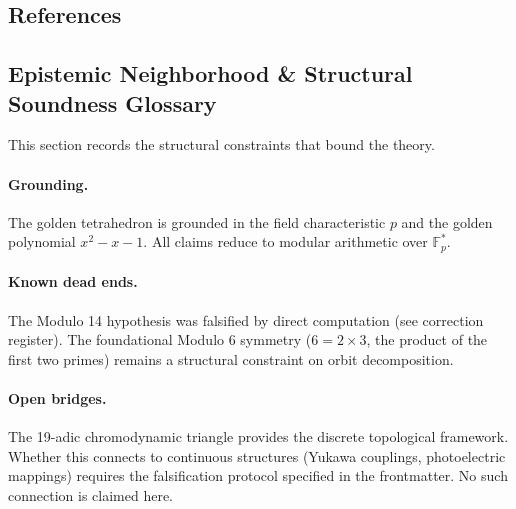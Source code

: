 \documentclass[12pt,oneside]{article}
\theoremstyle{principia}
\theoremstyle{definition}
\theoremstyle{remark}
\begin{document}
\subsection*{References}


\subsection*{Epistemic Neighborhood \& Structural Soundness Glossary}

This section records the structural constraints that bound the theory.

\paragraph{Grounding.} The golden tetrahedron is grounded in the field characteristic $p$ and the golden polynomial $x^2 - x - 1$. All claims reduce to modular arithmetic over $\mathbb{F}_p^*$.

\paragraph{Known dead ends.} The Modulo 14 hypothesis was falsified by direct computation (see correction register). The foundational Modulo 6 symmetry ($6 = 2 \times 3$, the product of the first two primes) remains a structural constraint on orbit decomposition.

\paragraph{Open bridges.} The 19-adic chromodynamic triangle provides the discrete topological framework. Whether this connects to continuous structures (Yukawa couplings, photoelectric mappings) requires the falsification protocol specified in the frontmatter. No such connection is claimed here.



\end{document}
